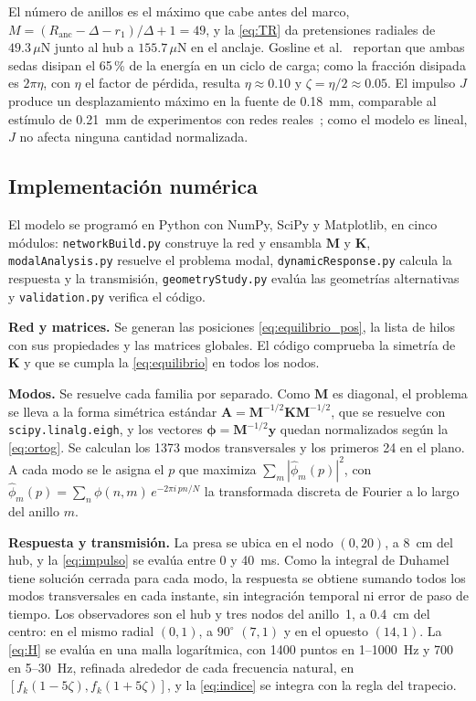 \documentclass[fleqn,final]{jaes}
\newcommand{\uN}{\,\mu\mathrm{N}}
\begin{document}
El número de anillos es el máximo que cabe antes del marco,
$M=(R_{\mathrm{anc}}-\Delta-r_1)/\Delta+1=49$, y la \cref{eq:TR} da
pretensiones radiales de $49.3\uN$ junto al hub a $155.7\uN$ en el
anclaje. Gosline et al.~\cite{gosline1999} reportan que ambas sedas
disipan el 65\,\% de la energía en un ciclo de carga; como la fracción
disipada es $2\pi\eta$, con $\eta$ el factor de pérdida, resulta
$\eta\approx0.10$ y $\zeta=\eta/2\approx0.05$. El impulso $J$ produce un
desplazamiento máximo en la fuente de 0.18~mm, comparable al estímulo de
0.21~mm de experimentos con redes reales~\cite{mortimer2018}; como el
modelo es lineal, $J$ no afecta ninguna cantidad normalizada.

\subsection{Implementación numérica}\label{sec:implementacion}

El modelo se programó en Python con NumPy, SciPy y Matplotlib, en cinco
módulos: \texttt{networkBuild.py} construye la red y ensambla
$\mathbf{M}$ y $\mathbf{K}$, \texttt{modalAnalysis.py} resuelve el
problema modal, \texttt{dynamicResponse.py} calcula la respuesta y la
transmisión, \texttt{geometryStudy.py} evalúa las geometrías alternativas
y \texttt{validation.py} verifica el código.

\textbf{Red y matrices.} Se generan las posiciones
\cref{eq:equilibrio_pos}, la lista de hilos con sus propiedades y las
matrices globales. El código comprueba la simetría
de $\mathbf{K}$ y que se cumpla la \cref{eq:equilibrio} en todos los
nodos.

\textbf{Modos.} Se resuelve cada familia por separado. Como $\mathbf{M}$
es diagonal, el problema se lleva a la forma simétrica estándar
$\mathbf{A}=\mathbf{M}^{-1/2}\mathbf{K}\mathbf{M}^{-1/2}$, que se resuelve
con \texttt{scipy.linalg.eigh}, y los vectores
$\boldsymbol{\phi}=\mathbf{M}^{-1/2}\mathbf{y}$ quedan normalizados según
la \cref{eq:ortog}. Se calculan los 1373 modos transversales y los
primeros 24 en el plano. A cada modo se le asigna el $p$ que maximiza
$\sum_m|\hat\phi_m(p)|^2$, con
$\hat\phi_m(p)=\sum_n\phi(n,m)\,e^{-2\pi i\,pn/N}$ la transformada
discreta de Fourier a lo largo del anillo $m$.

\textbf{Respuesta y transmisión.} La presa se ubica en el nodo $(0,20)$,
a 8~cm del hub, y la \cref{eq:impulso} se evalúa entre 0 y 40~ms. Como
la integral de Duhamel tiene solución cerrada para cada modo, la
respuesta se obtiene sumando todos los modos transversales en cada
instante, sin integración temporal ni error de paso de tiempo. Los
observadores son el hub y tres nodos del anillo~1, a 0.4~cm del centro: en
el mismo radial $(0,1)$, a $90^\circ$ $(7,1)$ y en el opuesto $(14,1)$. La
\cref{eq:H} se evalúa en una malla logarítmica, con 1400 puntos en
1--1000~Hz y 700 en 5--30~Hz, refinada alrededor de cada frecuencia
natural, en $[f_k(1-5\zeta),f_k(1+5\zeta)]$, y la \cref{eq:indice} se
integra con la regla del trapecio.
\end{document}
